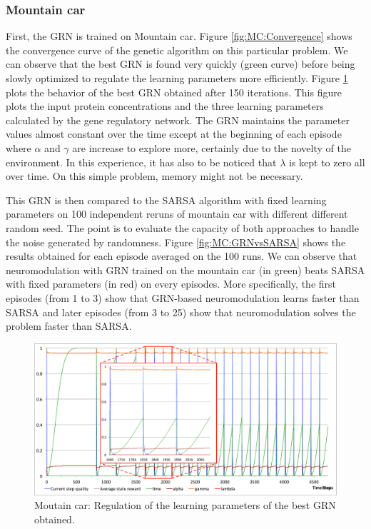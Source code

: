 \subsubsection{Mountain car}
First, the GRN is trained on Mountain car. Figure \ref{fig:MC:Convergence} shows the convergence curve of the genetic algorithm on this particular problem. We can observe that the best GRN is found very quickly (green curve) before being slowly optimized to regulate the learning parameters more efficiently. Figure \ref{fig:MC:GRNBehavior} plots the behavior of the best GRN obtained after 150 iterations. This figure plots the input protein concentrations and the three learning parameters calculated by the gene regulatory network. The GRN maintains the parameter values almost constant over the time except at the beginning of each episode where $\alpha$ and $\gamma$ are increase to explore more, certainly due to the novelty of the environment. In this experience, it has also to be noticed that $\lambda$ is kept to zero all over time. On this simple problem, memory might not be necessary. 

This GRN is then compared to the SARSA algorithm with fixed learning parameters on 100 independent reruns of mountain car with different different random seed. The point is to evaluate the capacity of both approaches to handle the noise generated by randomness. Figure \ref{fig:MC:GRNvsSARSA} shows the results obtained for each episode averaged on the 100 runs. We can observe that neuromodulation with GRN trained on the mountain car (in green) beats SARSA with fixed parameters (in red) on every episodes. More specifically, the first episodes (from 1 to 3) show that GRN-based neuromodulation learns faster than SARSA and later episodes (from 3 to 25) show that neuromodulation solves the problem faster than SARSA.

\begin{figure}
\center
\includegraphics[width=\linewidth]{MC_GRNBehavior.pdf}
\caption{Moutain car: Regulation of the learning parameters of the best GRN obtained.}\label{fig:MC:GRNBehavior}
\end{figure}

